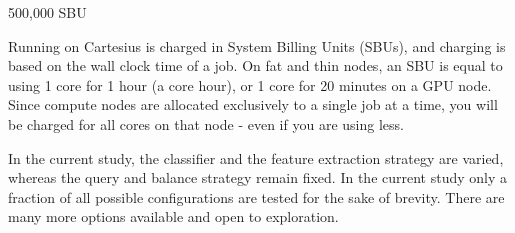 \documentclass[
]{article}
\begin{document}
500,000 SBU

Running on Cartesius is charged in System Billing Units (SBUs), and
charging is based on the wall clock time of a job. On fat and thin
nodes, an SBU is equal to using 1 core for 1 hour (a core hour), or 1
core for 20 minutes on a GPU node. Since compute nodes are allocated
exclusively to a single job at a time, you will be charged for all cores
on that node - even if you are using less.

In the current study, the classifier and the feature extraction strategy
are varied, whereas the query and balance strategy remain fixed. In the
current study only a fraction of all possible configurations are tested
for the sake of brevity. There are many more options available and open
to exploration.

\printbibliography[title=References]
\end{document}
